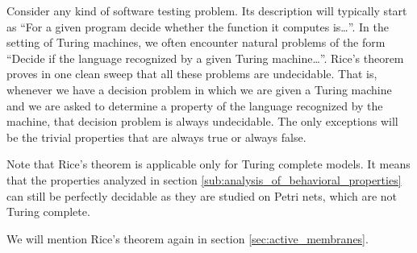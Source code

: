 Consider any kind of software testing problem. Its description will typically start as ``For a given program decide whether the function it computes is\ldots''. In the setting of Turing machines, we often encounter natural problems of the form ``Decide if the language recognized by a given Turing machine\ldots''. Rice's theorem \cite{Rice53Theorem} proves in one clean sweep that all these problems are undecidable. That is, whenever we have a decision problem in which we are given a Turing machine and we are asked to determine a property of the language recognized by the machine, that decision problem is always undecidable. The only exceptions will be the trivial properties that are always true or always false.

Note that Rice's theorem is applicable only for Turing complete models. It means that the properties analyzed in section \ref{sub:analysis_of_behavioral_properties} can still be perfectly decidable as they are studied on Petri nets, which are not Turing complete.

We will mention Rice's theorem again in section \ref{sec:active_membranes}.